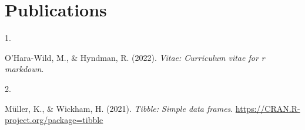 \documentclass[10pt,a4paper,]{twentysecondcv}
\newlength{\csllabelwidth}
\newcommand{\CSLLeftMargin}[1]{\parbox[t]{\csllabelwidth}{#1}}
\newcommand{\CSLRightInline}[1]{\parbox[t]{\linewidth - \csllabelwidth}{#1}}
\begin{document}
\hypertarget{publications}{%
\section{Publications}\label{publications}}

\hypertarget{bibliography}{}
\leavevmode\hypertarget{ref-R-vitae}{}%
\CSLLeftMargin{1. }
\CSLRightInline{O'Hara-Wild, M., \& Hyndman, R. (2022). \emph{Vitae:
Curriculum vitae for r markdown}.}

\leavevmode\hypertarget{ref-R-tibble}{}%
\CSLLeftMargin{2. }
\CSLRightInline{Müller, K., \& Wickham, H. (2021). \emph{Tibble: Simple
data frames}. \url{https://CRAN.R-project.org/package=tibble}}
\end{document}
